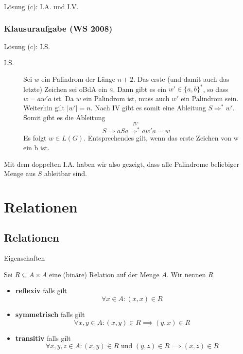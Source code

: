{\begin{frame}
\begin{block}{Lösung (c): I.A. und I.V.}
\begin{description}
	\end{description}
	\end{block}
\end{frame}

\begin{frame}
	\frametitle{Klausuraufgabe (WS 2008)}
	\begin{block}{Lösung (c): I.S.}
		\begin{description}
			\item[I.S.] Sei $w$ ein Palindrom der Länge $n + 2$. Das erste (und damit auch das letzte) Zeichen sei oBdA ein $a$. Dann gibt es ein $w' \in \{a, b\}^\ast$, so dass $w = aw'a$ ist. Da $w$ ein Palindrom ist, muss auch $w'$ ein Palindrom sein. Weiterhin gilt $|w'| = n$. \pause Nach IV gibt es somit eine Ableitung $S \Rightarrow^\ast w'$. Somit gibt es die Ableitung $$S \Rightarrow aSa \overset{IV}{\Rightarrow^\ast} aw'a = w$$ Es folgt $w \in L(G)$. \pause Entsprechendes gilt, wenn das erste Zeichen von w ein b ist. \\ 
		\end{description}
		Mit dem doppelten I.A. haben wir also gezeigt, dass alle Palindrome beliebiger Menge aus $S$ ableitbar sind.
	\end{block}

\end{frame}
}
\section{Relationen}
\subsection{Relationen}
\begin{frame}{Eigenschaften}
	\begin{Definition}
		Sei $R \subseteq A \times A$ eine (binäre) Relation auf der Menge $A$. Wir nennen $R$
		\begin{itemize}[<+->]
			\item \textbf{reflexiv} falls gilt $$\forall x \in A: (x,x) \in R$$
			\item \textbf{symmetrisch} falls gilt $$\forall x,y \in A: (x,y) \in R \implies (y,x) \in R$$
			\item \textbf{transitiv} falls gilt $$\forall x,y,z \in A: (x,y) \in R \text{ und } (y,z) \in R \implies (x,z) \in R$$
		\end{itemize}
	\end{Definition}
\end{frame}

